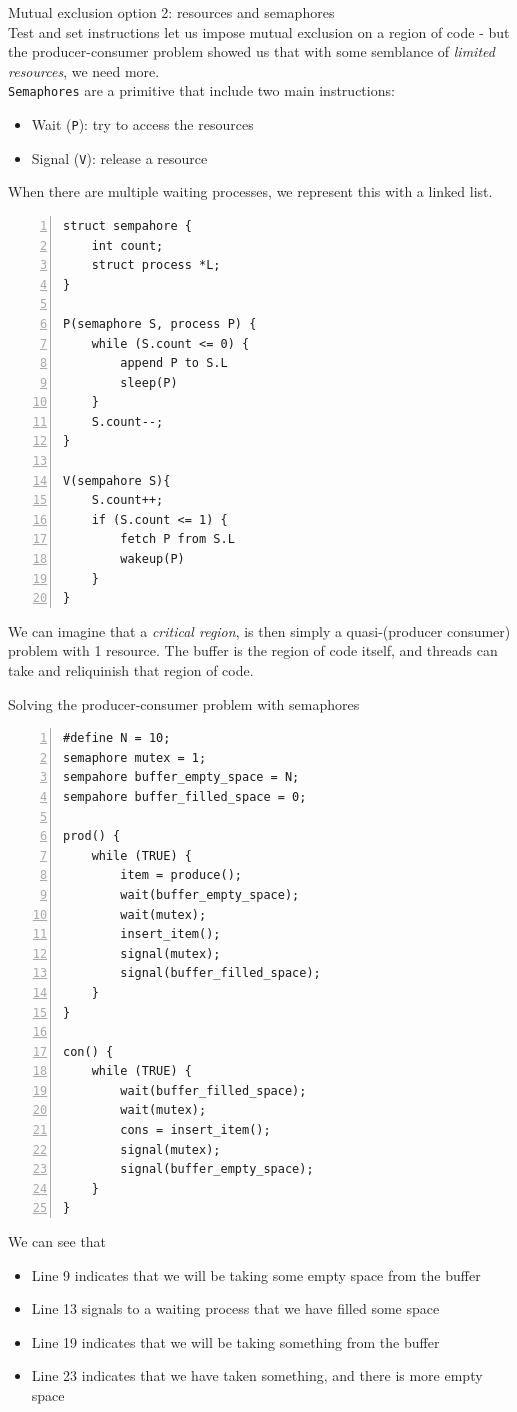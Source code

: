 \documentclass[journal, letterpaper]{IEEEtran}
\begin{document}
\begin{theory}{Mutual exclusion option 2: resources and semaphores} \\
    Test and set instructions let us impose mutual exclusion on a region of code - but the producer-consumer problem showed us that with some semblance of \textit{limited resources}, we need more.
    \newline \\
    \verb|Semaphores| are a primitive that include two main instructions:
    \begin{itemize}
        \item Wait (\verb|P|): try to access the resources
        \item Signal (\verb|V|): release a resource
    \end{itemize}
    When there are multiple waiting processes, we represent this with a linked list.
    \begin{Verbatim}[numbers=left, numbersep=2mm, frame=single]
struct sempahore {
    int count;
    struct process *L;
}

P(semaphore S, process P) {
    while (S.count <= 0) {
        append P to S.L
        sleep(P)
    }
    S.count--;
}

V(sempahore S){
    S.count++;
    if (S.count <= 1) {
        fetch P from S.L
        wakeup(P)
    }
}
    \end{Verbatim}
\end{theory}
We can imagine that a \textit{critical region}, is then simply a quasi-(producer consumer) problem with 1 resource. The buffer is the region of code itself, and threads can take and reliquinish that region of code.
\begin{example}{Solving the producer-consumer problem with semaphores} \\
    \begin{Verbatim}[numbers=left, numbersep=2mm, frame=single]
#define N = 10;
semaphore mutex = 1;
sempahore buffer_empty_space = N;
sempahore buffer_filled_space = 0;

prod() {
    while (TRUE) {
        item = produce();
        wait(buffer_empty_space);
        wait(mutex);
        insert_item();
        signal(mutex);
        signal(buffer_filled_space);
    }
}

con() {
    while (TRUE) {
        wait(buffer_filled_space);
        wait(mutex);
        cons = insert_item();
        signal(mutex);
        signal(buffer_empty_space);
    }
}
    \end{Verbatim}
    We can see that
    \begin{itemize}
        \item Line 9 indicates that we will be taking some empty space from the buffer
        \item Line 13 signals to a waiting process that we have filled some space
        \item Line 19 indicates that we will be taking something from the buffer
        \item Line 23 indicates that we have taken something, and there is more empty space
    \end{itemize}
\end{example}
\end{document}
